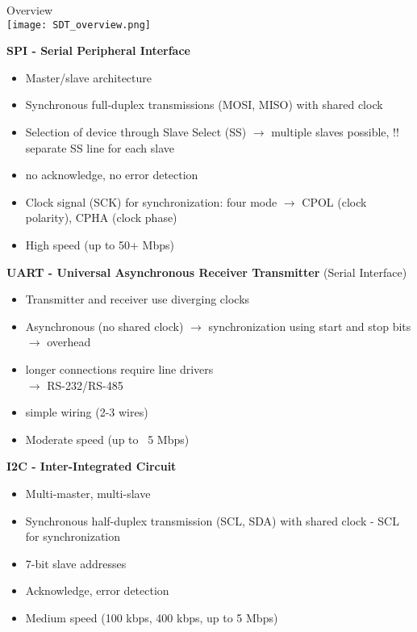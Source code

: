 \begin{concept}{Overview}\\
    \texttt{[image: SDT\_overview.png]}

    \textbf{SPI - Serial Peripheral Interface}
    \begin{itemize}
        \item Master/slave architecture
        \item Synchronous full-duplex transmissions (MOSI, MISO) with shared clock
        \item Selection of device through Slave Select (SS) $\rightarrow$ multiple slaves possible, !! separate SS line for each slave
        \item no acknowledge, no error detection
        \item Clock signal (SCK) for synchronization: four mode $\rightarrow$ CPOL (clock polarity), CPHA (clock phase)
        \item High speed (up to 50+ Mbps)
    \end{itemize}
    \vspace{2mm}

    \begin{minipage}{0.5\linewidth}
    \textbf{UART - Universal Asynchronous Receiver Transmitter} (Serial Interface)
    \begin{itemize}
        \item Transmitter and receiver use diverging clocks
        \item Asynchronous (no shared clock) $\rightarrow$ synchronization using start and stop bits $\rightarrow$ overhead
        \item longer connections require line drivers \\ $\rightarrow$ RS-232/RS-485
        \item simple wiring (2-3 wires)
        \item Moderate speed (up to ~5 Mbps)
    \end{itemize}
    \end{minipage}
    \hspace{3mm}
    \begin{minipage}{0.45\linewidth}
    \textbf{I2C - Inter-Integrated Circuit}
    \begin{itemize}
        \item Multi-master, multi-slave
        \item Synchronous half-duplex transmission (SCL, SDA) with shared clock - SCL for synchronization
        \item 7-bit slave addresses
        \item Acknowledge, error detection
        \item Medium speed (100 kbps, 400 kbps, up to 5 Mbps)
    \end{itemize}
    \end{minipage}
\end{concept}


